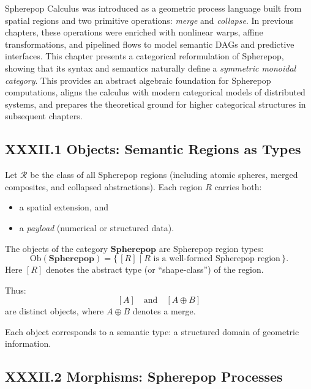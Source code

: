 \documentclass[11pt,letterpaper]{article}
\begin{document}
Spherepop Calculus was introduced as a geometric process language built from spatial regions and two primitive operations: \emph{merge} and \emph{collapse}. In previous chapters, these operations were enriched with nonlinear warps, affine transformations, and pipelined flows to model semantic DAGs and predictive interfaces. This chapter presents a categorical reformulation of Spherepop, showing that its syntax and semantics naturally define a \emph{symmetric monoidal category}. This provides an abstract algebraic foundation for Spherepop computations, aligns the calculus with modern categorical models of distributed systems, and prepares the theoretical ground for higher categorical structures in subsequent chapters.

\subsection{XXXII.1 Objects: Semantic Regions as Types}

Let $\mathcal{R}$ be the class of all Spherepop regions (including atomic spheres, merged composites, and collapsed abstractions). Each region $R$ carries both:

\begin{itemize}
    \item a spatial extension, and 
    \item a \emph{payload} (numerical or structured data).
\end{itemize}

\begin{definition}
The objects of the category $\mathbf{Spherepop}$ are Spherepop region types:
\[
\mathrm{Ob}(\mathbf{Spherepop}) = \{\, [R] \mid R \text{ is a well-formed Spherepop region}\,\}.
\]
Here $[R]$ denotes the abstract type (or ``shape-class'') of the region.
\end{definition}

Thus:
\[
[A] \quad\text{and}\quad [A \oplus B]
\]
are distinct objects, where $A \oplus B$ denotes a merge.

Each object corresponds to a semantic type: a structured domain of geometric information.

\subsection{XXXII.2 Morphisms: Spherepop Processes}
\end{document}
